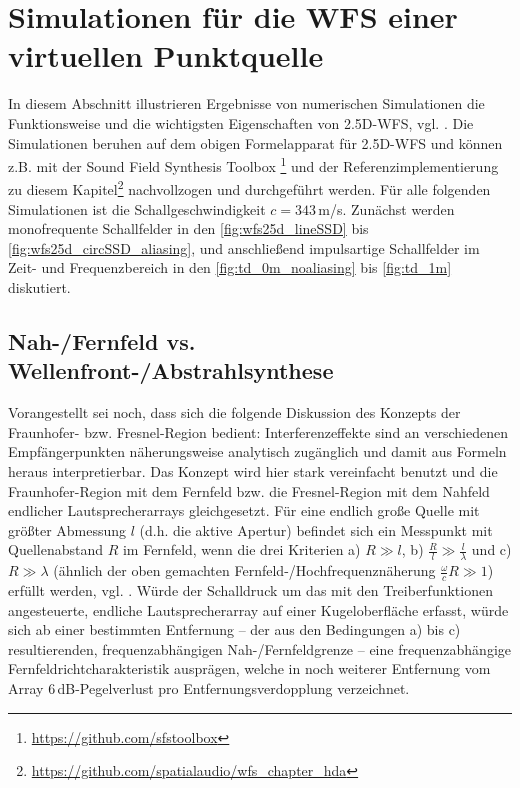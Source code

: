 \section{Simulationen für die WFS einer virtuellen Punktquelle}
\label{sec:WFS_PointSource_Simulationen}
%
In diesem Abschnitt illustrieren Ergebnisse von numerischen Simulationen die
Funktionsweise und die wichtigsten Eigenschaften von 2.5D-WFS,
vgl. \cite{Berkhout1993_JASA,Boone1995_JAES,Start1997_diss,Spors2010a}.
%
Die Simulationen beruhen auf dem obigen Formelapparat für 2.5D-WFS
und können z.B. mit der Sound Field Synthesis
Toolbox \cite{Winter2019dagaposter}\footnote{\url{https://github.com/sfstoolbox}}
und der Referenzimplementierung zu diesem
Kapitel\footnote{\url{https://github.com/spatialaudio/wfs_chapter_hda}}
nachvollzogen und durchgeführt werden.
%
Für alle folgenden Simulationen ist die Schallgeschwindigkeit $c=343$\,m/s.
%
Zunächst werden monofrequente Schallfelder in den
\Abb\ref{fig:wfs25d_lineSSD} bis \ref{fig:wfs25d_circSSD_aliasing},
und anschließend
impulsartige Schallfelder im Zeit- und Frequenzbereich
in den \Abb\ref{fig:td_0m_noaliasing} bis \ref{fig:td_1m}
diskutiert.



\subsection{Nah-/Fernfeld vs. Wellenfront-/Abstrahlsynthese}
%
Vorangestellt sei noch, dass sich die folgende Diskussion des Konzepts der Fraunhofer-
bzw. Fresnel-Region \cite[Kap.~26]{Skudrzyk1971} bedient: Interferenzeffekte
sind an verschiedenen Empfängerpunkten näherungsweise analytisch zugänglich und
damit aus Formeln heraus interpretierbar.
%
Das Konzept wird hier stark vereinfacht benutzt und die Fraunhofer-Region mit dem
Fernfeld bzw. die Fresnel-Region mit dem
Nahfeld endlicher Lautsprecherarrays gleichgesetzt.
%
Für eine endlich große Quelle mit größter Abmessung $l$ (d.h. die aktive Apertur)
befindet sich ein Messpunkt mit Quellenabstand $R$ im Fernfeld, wenn die
drei Kriterien
a) $R \gg l$,
b) $\frac{R}{l} \gg \frac{l}{\lambda}$ und
c) $R \gg \lambda$ (ähnlich der oben gemachten Fernfeld-/Hochfrequenznäherung
$\frac{\omega}{c} R \gg 1$) erfüllt werden, vgl. \cite[Kap.~3.5.4]{Moeser2015_book}.
%
Würde der Schalldruck um das mit den Treiberfunktionen angesteuerte,
endliche Lautsprecherarray auf einer Kugeloberfläche erfasst, würde sich ab einer
bestimmten Entfernung -- der aus den Bedingungen a) bis c) resultierenden,
frequenzabhängigen Nah-/Fernfeldgrenze -- eine
frequenzabhängige
Fernfeldrichtcharakteristik ausprägen, welche in
noch weiterer Entfernung vom Array
$6$\,dB-Pegelverlust pro Entfernungsverdopplung verzeichnet.



